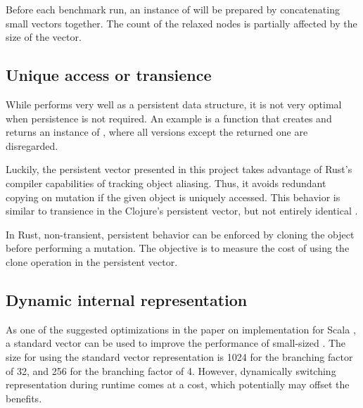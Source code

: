 Before each benchmark run, an instance of \rrbvec{} will be prepared by concatenating small vectors together. The count of the relaxed nodes is partially affected by the size of the vector.

\subsection{Unique access or transience}
While \rrbvec{} performs very well as a persistent data structure, it is not very optimal when persistence is not required. An example is a function that creates and returns an instance of \rrbvec{}, where all versions except the returned one are disregarded.

Luckily, the persistent vector presented in this project takes advantage of Rust's compiler capabilities of tracking object aliasing. Thus, it avoids redundant copying on mutation if the given object is uniquely accessed. This behavior is similar to transience in the Clojure's persistent vector, but not entirely identical \cite{improving-performance-through-transience}.

In Rust, non-transient, persistent behavior can be enforced by cloning the object before performing a mutation. The objective is to measure the cost of using the clone operation in the persistent vector.



\subsection{Dynamic internal representation}
As one of the suggested optimizations in the paper on \rrbvec{} implementation for Scala \cite{rrb-vector-practical-general-purpose-im-sequence}, a standard vector can be used to improve the performance of small-sized \rrbvec{}. The size for using the standard vector representation is 1024 for the branching factor of 32, and 256 for the branching factor of 4. However, dynamically switching representation during runtime comes at a cost, which potentially may offset the benefits.


